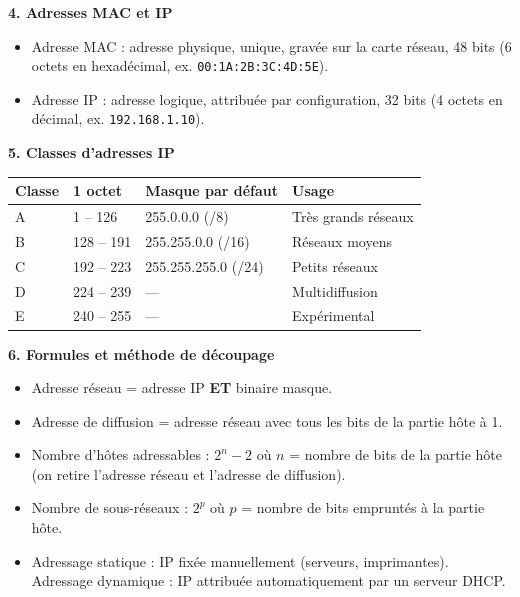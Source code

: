\documentclass[11pt]{article}
\newcommand{\cle}[1]{{\popxbold\color{popdark}#1}}
\begin{document}
\begin{bilan}
\textbf{4. Adresses MAC et IP}
\begin{itemize}
  \item \cle{Adresse MAC} : adresse physique, unique, gravée sur la carte réseau, 48 bits (6 octets en hexadécimal, ex. \texttt{00:1A:2B:3C:4D:5E}).
  \item \cle{Adresse IP} : adresse logique, attribuée par configuration, 32 bits (4 octets en décimal, ex. \texttt{192.168.1.10}).
\end{itemize}

\textbf{5. Classes d'adresses IP}
\begin{center}
\begin{tabularx}{\linewidth}{|l|l|l|X|}
\hline
\rowcolor{popblueL} \textbf{Classe} & \textbf{1\ier{} octet} & \textbf{Masque par défaut} & \textbf{Usage} \\
\hline
A & 1 -- 126 & 255.0.0.0 (/8) & Très grands réseaux \\
\hline
B & 128 -- 191 & 255.255.0.0 (/16) & Réseaux moyens \\
\hline
C & 192 -- 223 & 255.255.255.0 (/24) & Petits réseaux \\
\hline
D & 224 -- 239 & --- & Multidiffusion \\
\hline
E & 240 -- 255 & --- & Expérimental \\
\hline
\end{tabularx}
\end{center}

\textbf{6. Formules et méthode de découpage}
\begin{itemize}
  \item \cle{Adresse réseau} = adresse IP \textbf{ET} binaire masque.
  \item \cle{Adresse de diffusion} = adresse réseau avec tous les bits de la partie hôte à 1.
  \item Nombre d'hôtes adressables : $2^{n} - 2$ où $n$ = nombre de bits de la partie hôte (on retire l'adresse réseau et l'adresse de diffusion).
  \item Nombre de sous-réseaux : $2^{p}$ où $p$ = nombre de bits empruntés à la partie hôte.
  \item \cle{Adressage statique} : IP fixée manuellement (serveurs, imprimantes). \cle{Adressage dynamique} : IP attribuée automatiquement par un serveur DHCP.
\end{itemize}
\end{bilan}
\end{document}

